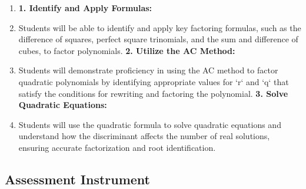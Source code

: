 \begin{enumerate}
    \item \textbf{1. Identify and Apply Formulas:}
    \item Students will be able to identify and apply key factoring formulas, such as the difference of squares, perfect square trinomials, and the sum and difference of cubes, to factor polynomials. \textbf{2. Utilize the AC Method:}
    \item Students will demonstrate proficiency in using the AC method to factor quadratic polynomials by identifying appropriate values for `r` and `q` that satisfy the conditions for rewriting and factoring the polynomial. \textbf{3. Solve Quadratic Equations:}
    \item Students will use the quadratic formula to solve quadratic equations and understand how the discriminant affects the number of real solutions, ensuring accurate factorization and root identification.
\end{enumerate}

\subsection{Assessment Instrument}

